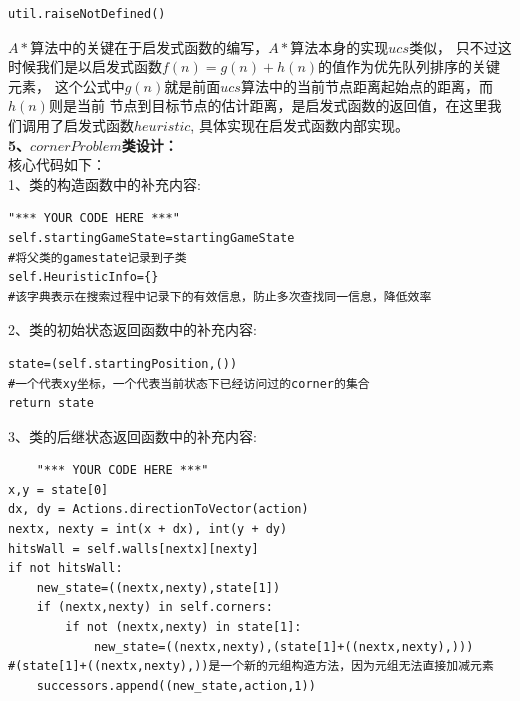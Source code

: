\documentclass[a4paper,12pt,UTF8]{article}
\begin{document}
\begin{flushleft}
{{\begin{lstlisting}
util.raiseNotDefined()
        \end{lstlisting}
    }
    \normalsize{
        \hspace{1cm}$A*$算法中的关键在于启发式函数的编写，$A*$算法本身的实现$ucs$类似，
        只不过这时候我们是以启发式函数$f(n)=g(n)+h(n)$的值作为优先队列排序的关键元素，
        这个公式中$g(n)$就是前面$ucs$算法中的当前节点距离起始点的距离，而$h(n)$则是当前
        节点到目标节点的估计距离，是启发式函数的返回值，在这里我们调用了启发式函数$heuristic$,
        具体实现在启发式函数内部实现。\\
    }
    \large{
        \hspace{1cm}\textbf{5、$cornerProblem$类设计：\\}
    }
    \normalsize{
        \hspace{1cm}核心代码如下：\\
    }
    \hspace{1cm}\normalsize{1、类的构造函数中的补充内容:\\}
    \scriptsize{
        \begin{lstlisting}
"*** YOUR CODE HERE ***"
self.startingGameState=startingGameState 
#将父类的gamestate记录到子类
self.HeuristicInfo={}
#该字典表示在搜索过程中记录下的有效信息，防止多次查找同一信息，降低效率
        \end{lstlisting}                   
    }
    \hspace{1cm}\normalsize{2、类的初始状态返回函数中的补充内容:\\}
    \scriptsize{
        \begin{lstlisting}
state=(self.startingPosition,())
#一个代表xy坐标，一个代表当前状态下已经访问过的corner的集合
return state
        \end{lstlisting}
    }
    \hspace{1cm}\normalsize{3、类的后继状态返回函数中的补充内容:\\}
    \scriptsize{            
        \begin{lstlisting}
    "*** YOUR CODE HERE ***"
x,y = state[0]
dx, dy = Actions.directionToVector(action)
nextx, nexty = int(x + dx), int(y + dy)
hitsWall = self.walls[nextx][nexty]
if not hitsWall:
    new_state=((nextx,nexty),state[1])
    if (nextx,nexty) in self.corners: 
        if not (nextx,nexty) in state[1]:
            new_state=((nextx,nexty),(state[1]+((nextx,nexty),)))
#(state[1]+((nextx,nexty),))是一个新的元组构造方法，因为元组无法直接加减元素
    successors.append((new_state,action,1))
        \end{lstlisting}
}}
\end{flushleft}
\end{document}
